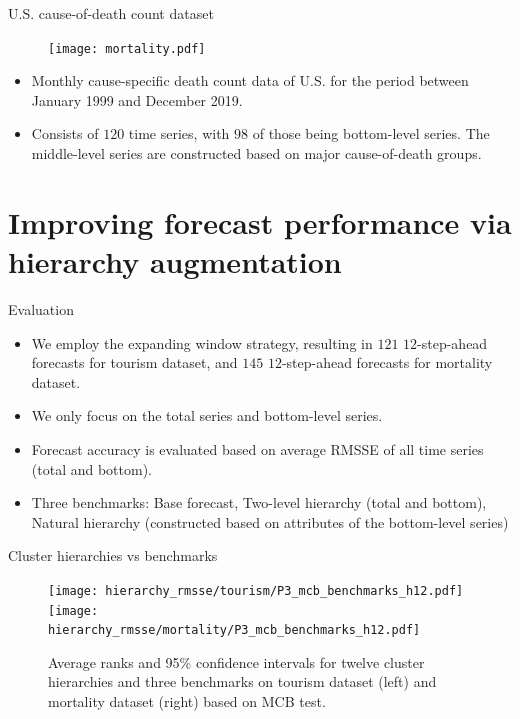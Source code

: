 \documentclass[aspectratio=169]{beamer}
\begin{document}
\begin{frame}{U.S. cause-of-death count dataset}
	\begin{figure}
		\texttt{[image: mortality.pdf]}
	\end{figure}
	\begin{itemize}
		\item Monthly cause-specific death count data of U.S. for the period between January 1999 and December 2019.
		\item Consists of $120$ time series, with $98$ of those being bottom-level series. The middle-level series are constructed based on major cause-of-death groups.
	\end{itemize}
\end{frame}

\section{Improving forecast performance via hierarchy augmentation}

\begin{frame}{Evaluation}

	\begin{itemize}
		\item We employ the expanding window strategy, resulting in $121$ $12$-step-ahead forecasts for tourism dataset, and $145$ $12$-step-ahead forecasts for mortality dataset.
		\item We only focus on the total series and bottom-level series.
		\item Forecast accuracy is evaluated based on average RMSSE of all time series (total and bottom).
		\item {\color{red} Three benchmarks}: Base forecast, Two-level hierarchy (total and bottom), Natural hierarchy (constructed based on attributes of the bottom-level series)
	\end{itemize}
	
\end{frame}

\begin{frame}{Cluster hierarchies vs benchmarks}
	
	\begin{figure}
		\centering
		\texttt{[image: hierarchy\_rmsse/tourism/P3\_mcb\_benchmarks\_h12.pdf]}
		\texttt{[image: hierarchy\_rmsse/mortality/P3\_mcb\_benchmarks\_h12.pdf]}
		\caption{Average ranks and 95\% confidence intervals for twelve cluster hierarchies and three benchmarks on tourism dataset (left) and mortality dataset (right) based on MCB test.}
	\end{figure}

\end{frame}
\end{document}
